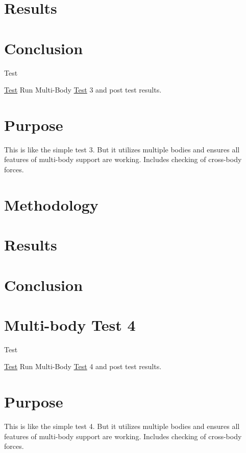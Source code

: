 \section*{Results}

\section*{Conclusion}

\begin{DoxyRefDesc}{Test}
\item[\hyperlink{test__test000012}{Test}]Run Multi-\/\-Body \hyperlink{class_test}{Test} 3 and post test results.\end{DoxyRefDesc}


\section*{Purpose}

This is like the simple test 3. But it utilizes multiple bodies and ensures all features of multi-\/body support are working. Includes checking of cross-\/body forces.

\section*{Methodology}

\section*{Results}

\section*{Conclusion}\hypertarget{MultiBodyTest4}{}\section{Multi-\/body Test 4}\label{MultiBodyTest4}
\begin{DoxyRefDesc}{Test}
\item[\hyperlink{test__test000004}{Test}]Run Multi-\/\-Body \hyperlink{class_test}{Test} 4 and post test results.\end{DoxyRefDesc}


\section*{Purpose}

This is like the simple test 4. But it utilizes multiple bodies and ensures all features of multi-\/body support are working. Includes checking of cross-\/body forces.

